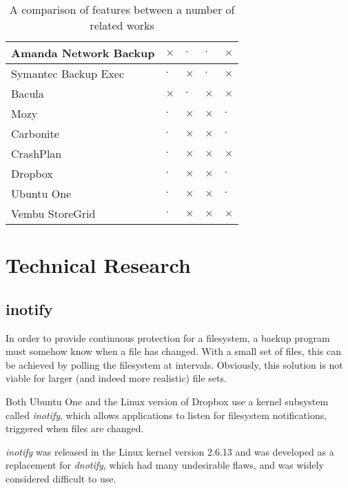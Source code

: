 \begin{bibunit}[plain]
\begin{table}[H]
\begin{tabular}{ | l | p{1.5cm} | p{1.5cm} | p{1.5cm} | p{1.5cm} | }
        Amanda Network Backup   & $\times$  & $\cdot$   & $\cdot$   & $\times$
            \\ \hline

        Symantec Backup Exec    & $\cdot$   & $\times$  & $\cdot$   & $\times$
            \\ \hline

        Bacula                  & $\times$  & $\cdot$   & $\times$  & $\times$
            \\ \hline

        Mozy                    & $\cdot$   & $\times$  & $\times$  & $\cdot$
            \\ \hline

        Carbonite               & $\cdot$   & $\times$  & $\times$  & $\cdot$
            \\ \hline

        CrashPlan               & $\cdot$   & $\times$  & $\times$  & $\times$
            \\ \hline

        Dropbox                 & $\cdot$   & $\times$  & $\times$  & $\cdot$
            \\ \hline

        Ubuntu One              & $\cdot$   & $\times$  & $\times$  & $\cdot$
            \\ \hline

        Vembu StoreGrid         & $\cdot$   & $\times$  & $\times$  & $\times$
            \\ \hline
    \end{tabular}
    \caption{A comparison of features between a number of related works}
    \label{tab:feature-comparison}
\end{table}

\section{Technical Research}

\subsection{inotify}

In order to provide continuous protection for a filesystem, a backup program
must somehow know when a file has changed. With a small set of files, this can
be achieved by polling the filesystem at intervals. Obviously, this solution is
not viable for larger (and indeed more realistic) file sets.

Both Ubuntu One and the Linux version of Dropbox use a kernel subsystem called
\emph{inotify}, which allows applications to listen for filesystem
notifications, triggered when files are changed.

\emph{inotify} was released in the Linux kernel version 2.6.13 and was
developed as a replacement for \emph{dnotify}, which had many undesirable
flaws, and was widely considered difficult to use\cite{love2005}.

\putbib[research]

\end{bibunit}

